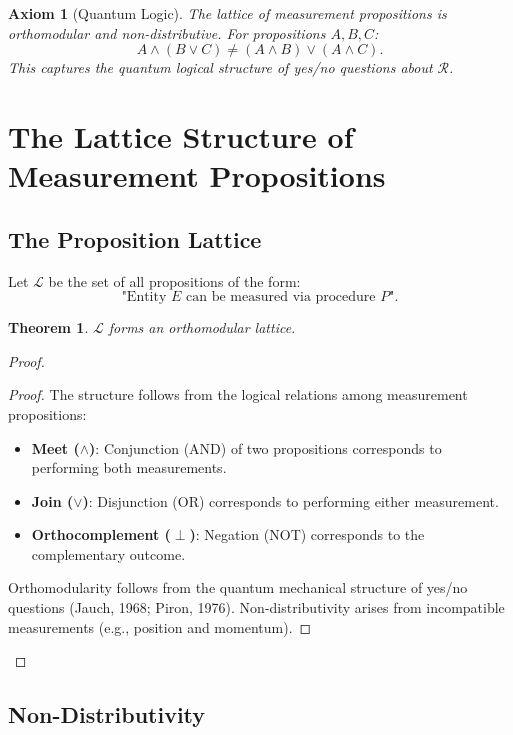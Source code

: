 \documentclass[aps,preprint,showpacs,showkeys]{revtex4}%
\newtheorem{axiom}{Axiom}
\newtheorem{theorem}{Theorem}
\begin{document}
\begin{axiom}[Quantum Logic]
The lattice of measurement propositions is orthomodular and
non-distributive. For propositions $A, B, C$: 
\begin{equation}
A \wedge (B \vee C) \neq (A \wedge B) \vee (A \wedge C).
\end{equation}
This captures the quantum logical structure of yes/no questions about $%
\mathcal{R}$.
\end{axiom}

\section{The Lattice Structure of Measurement Propositions}

\subsection{The Proposition Lattice}

Let $\mathcal{L}$ be the set of all propositions of the form: 
\begin{equation}
\text{"Entity } E \text{ can be measured via procedure } P\text{"}.
\end{equation}

\begin{theorem}
$\mathcal{L}$ forms an orthomodular lattice.
\end{theorem}

\begin{proof}
\begin{proof}
The structure follows from the logical relations among measurement propositions:
\begin{itemize}
    \item \textbf{Meet ($\wedge$)}: Conjunction (AND) of two propositions corresponds to performing both measurements.
    \item \textbf{Join ($\vee$)}: Disjunction (OR) corresponds to performing either measurement.
    \item \textbf{Orthocomplement ($\perp$)}: Negation (NOT) corresponds to the complementary outcome.
\end{itemize}
Orthomodularity follows from the quantum mechanical structure of yes/no questions (Jauch, 1968; Piron, 1976). Non-distributivity arises from incompatible measurements (e.g., position and momentum).
\end{proof}
\end{proof}

\subsection{Non-Distributivity}
\end{document}
